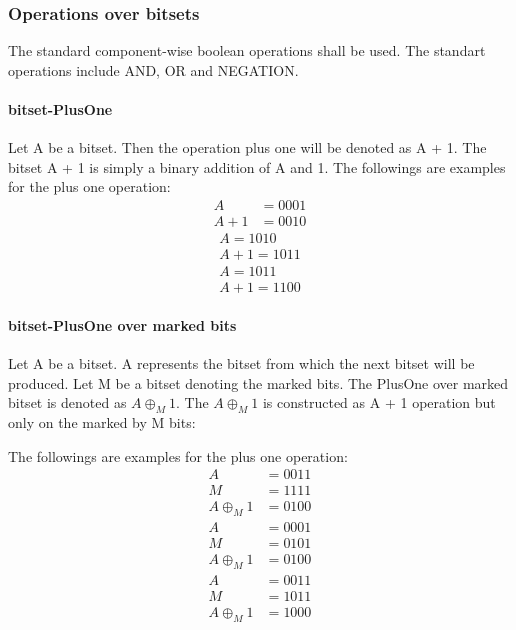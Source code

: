 \documentclass{article}
\begin{document}
		\subsubsection*{Operations over bitsets}
			The standard component-wise boolean operations shall be used. The standart operations include AND, OR and NEGATION.
			
			\paragraph{bitset-PlusOne}
			Let A be a bitset. Then the operation plus one will be denoted as A + 1. The bitset A + 1 is simply a binary addition of A and 1.
			The followings are examples for the plus one operation:
			\begin{align*}
			A &= 0001 \\
			A + 1 &= 0010
			\end{align*}
			\begin{align*}
			A  = 1010 \\
			A + 1 = 1011
			\end{align*}
			\begin{align*}
			A = 1011 \\
			A + 1 = 1100
			\end{align*}

			\paragraph{bitset-PlusOne over marked bits}
			Let A be a bitset. A represents the bitset from which the next bitset will be produced.
			Let M be a bitset denoting the marked bits.
			The PlusOne over marked bitset is denoted as  $A \oplus_M 1$.
			The $A \oplus_M 1$ is constructed as A + 1 operation but only on the marked by M bits:

			The followings are examples for the plus one operation:
			\begin{align*}
			A &= 0011 \\
			M &= 1111 \\
			A \oplus_M 1 &= 0100
			\end{align*}
			\begin{align*}
			A &= 0001 \\
			M &= 0101 \\
			A \oplus_M 1 &= 0100
			\end{align*}
			\begin{align*}
			A &= 0011 \\
			M &= 1011 \\
			A \oplus_M 1 &= 1000
			\end{align*}
\end{document}
